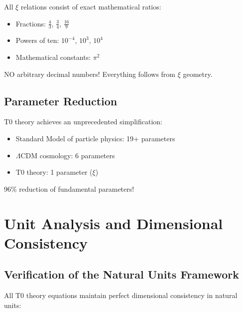 	\begin{important}
		All $\xi$ relations consist of exact mathematical ratios:
		\begin{itemize}
			\item Fractions: $\frac{4}{3}$, $\frac{3}{4}$, $\frac{16}{9}$
			\item Powers of ten: $10^{-4}$, $10^3$, $10^4$
			\item Mathematical constants: $\pi^2$
		\end{itemize}
		NO arbitrary decimal numbers! Everything follows from $\xi$ geometry.
	\end{important}
	
	\subsection{Parameter Reduction}
	
	\begin{revolutionary}
		T0 theory achieves an unprecedented simplification:
		\begin{itemize}
			\item Standard Model of particle physics: 19+ parameters
			\item $\Lambda$CDM cosmology: 6 parameters
			\item T0 theory: 1 parameter ($\xi$)
		\end{itemize}
		96\% reduction of fundamental parameters!
	\end{revolutionary}
	
	\section{Unit Analysis and Dimensional Consistency}
	
	\subsection{Verification of the Natural Units Framework}
	
	All T0 theory equations maintain perfect dimensional consistency in natural units:
	
	\begin{table}[h]
		\centering
		\caption{Dimensional consistency in natural units}
	\end{table}
	
